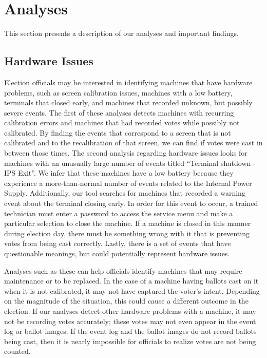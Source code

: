 \section{Analyses}
This section presents a description of our analyses and important findings.



\subsection{Hardware Issues}
Election officials may be interested in identifying machines that have hardware problems, such as screen calibration issues, machines with a low battery, terminals that closed early, and machines that recorded unknown, but possibly severe events.  The first of these analyses detects machines with recurring calibration errors and machines that had recorded votes while possibly not calibrated.  By finding the events that correspond to a screen that is not calibrated and to the recalibration of that screen, we can find if votes were cast in between those times.  The second analysis regarding hardware issues looks for machines with an unusually large number of events titled \textquotedblleft Terminal shutdown - IPS Exit\textquotedblright .  We infer that these machines have a low battery because they experience a more-than-normal number of events related to the Internal Power Supply.  Additionally, our tool searches for machines that recorded a warning event about the terminal closing early.  In order for this event to occur, a trained technician must enter a password to access the service menu and make a particular selection to close the machine.  If a machine is closed in this manner during election day, there must be something wrong with it that is preventing votes from being cast correctly.  Lastly, there is a set of events that have questionable meanings, but could potentially represent hardware issues.  

Analyses such as these can help officials identify machines that may require maintenance or to be replaced.  In the case of a machine having ballots cast on it when it is not calibrated, it may not have captured the voter's intent.  Depending on the magnitude of the situation, this could cause a different outcome in the election.  If our analyses detect other hardware problems with a machine, it may not be recording votes accurately; these votes may not even appear in the event log or ballot images.  If the event log and the ballot images do not record ballots being cast, then it is nearly impossible for officials to realize votes are not being counted.  

